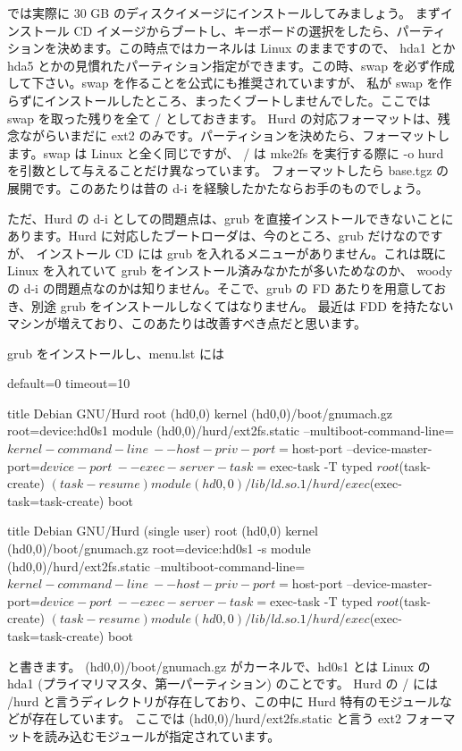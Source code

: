 \documentclass[mingoth,a4paper]{jsarticle}
\begin{document}
では実際に 30 GB のディスクイメージにインストールしてみましょう。
まずインストール CD イメージからブートし、キーボードの選択をしたら、パーティションを決めます。この時点ではカーネルは Linux のままですので、
hda1 とか hda5 とかの見慣れたパーティション指定ができます。この時、swap を必ず作成して下さい。swap を作ることを公式にも推奨されていますが、
私が swap を作らずにインストールしたところ、まったくブートしませんでした。ここでは swap を取った残りを全て / としておきます。
Hurd の対応フォーマットは、残念ながらいまだに ext2 のみです。パーティションを決めたら、フォーマットします。swap は Linux と全く同じですが、
/ は mke2fs を実行する際に -o hurd を引数として与えることだけ異なっています。
フォーマットしたら base.tgz の展開です。このあたりは昔の d-i を経験したかたならお手のものでしょう。

ただ、Hurd の d-i としての問題点は、grub を直接インストールできないことにあります。Hurd に対応したブートローダは、今のところ、grub だけなのですが、
インストール CD には grub を入れるメニューがありません。これは既に Linux を入れていて grub をインストール済みなかたが多いためなのか、
woody の d-i の問題点なのかは知りません。そこで、grub の FD あたりを用意しておき、別途 grub をインストールしなくてはなりません。
最近は FDD を持たないマシンが増えており、このあたりは改善すべき点だと思います。

grub をインストールし、menu.lst には
\begin{commandline}
default=0
timeout=10

title  Debian GNU/Hurd
root (hd0,0)
kernel (hd0,0)/boot/gnumach.gz root=device:hd0s1
module (hd0,0)/hurd/ext2fs.static --multiboot-command-line=${kernel-command-line} \
--host-priv-port=${host-port} --device-master-port=${device-port} \
--exec-server-task=${exec-task} -T typed ${root} $(task-create) $(task-resume)
module (hd0,0)/lib/ld.so.1 /hurd/exec $(exec-task=task-create)
boot

title  Debian GNU/Hurd (single user)
root (hd0,0)
kernel (hd0,0)/boot/gnumach.gz root=device:hd0s1 -s
module (hd0,0)/hurd/ext2fs.static --multiboot-command-line=${kernel-command-line} \
--host-priv-port=${host-port} --device-master-port=${device-port} \
--exec-server-task=${exec-task} -T typed ${root} $(task-create) $(task-resume)
module (hd0,0)/lib/ld.so.1 /hurd/exec $(exec-task=task-create)
boot
\end{commandline}
と書きます。 (hd0,0)/boot/gnumach.gz がカーネルで、hd0s1 とは Linux の hda1 (プライマリマスタ、第一パーティション) のことです。
Hurd の / には /hurd と言うディレクトリが存在しており、この中に Hurd 特有のモジュールなどが存在しています。
ここでは (hd0,0)/hurd/ext2fs.static と言う ext2 フォーマットを読み込むモジュールが指定されています。
\end{document}
